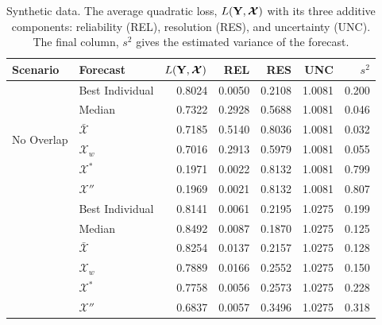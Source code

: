 \documentclass[11pt]{article}
\theoremstyle{definition}
\theoremstyle{definition}
\def\Y{{\bf Y}}
\begin{document}
\begin{table}[h!]
\centering
\caption{Synthetic data. The average quadratic loss, $L(\Y,\boldsymbol{\mathcal{X}} )$ with its three additive components: reliability (REL), resolution (RES), and uncertainty (UNC). The final column, $s^2$ gives the estimated variance of the forecast.} 
\begin{tabular}{llrrrrr}
  \hline \hline
Scenario & Forecast & $L(\Y,\boldsymbol{\mathcal{X}} )$ & REL & RES & UNC & $s^2$ \\ 
  \hline
 \multirow{6}{*}{No Overlap} & Best Individual & 0.8024 & 0.0050 & 0.2108 & 1.0081 & 0.200\\ 
  & Median & 0.7322 & 0.2928 & 0.5688 & 1.0081& 0.046\\ 
  & $\bar{\mathcal{X}}$ & 0.7185 & 0.5140 & 0.8036 & 1.0081 & 0.032\\ 
  & $\mathcal{X}_w$ & 0.7016 & 0.2913 & 0.5979 & 1.0081 & 0.055\\ 
  & $\mathcal{X}^*$  & 0.1971 & 0.0022 & 0.8132 & 1.0081& 0.799\\ 
  & $\mathcal{X}''$ & 0.1969 & 0.0021 & 0.8132 & 1.0081 & 0.807\\ \rule{0pt}{2.9ex} 
  \multirow{6}{*}{High Overlap} &  Best Individual & 0.8141 & 0.0061 & 0.2195 & 1.0275 &0.199\\ 
  & Median & 0.8492 & 0.0087 & 0.1870 & 1.0275 &0.125 \\ 
  & $\bar{\mathcal{X}}$ & 0.8254 & 0.0137 & 0.2157 & 1.0275 &0.128\\ 
  & $\mathcal{X}_w$ & 0.7889 & 0.0166 & 0.2552 & 1.0275 &0.150 \\ 
  & $\mathcal{X}^*$  & 0.7758 & 0.0056 & 0.2573 & 1.0275 &0.228 \\ 
  &$\mathcal{X}''$ & 0.6837 & 0.0057 & 0.3496 & 1.0275 &0.318 \\ 
   \hline
\end{tabular}
\label{scenA}
\end{table}
\end{document}
